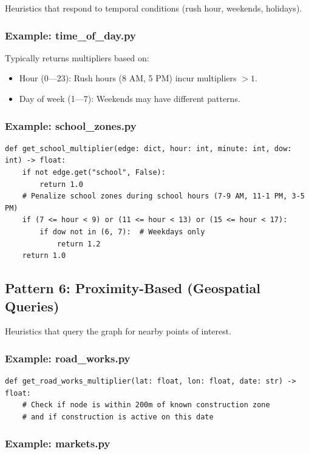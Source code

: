 \documentclass[12pt,a4paper]{article}
\begin{document}
Heuristics that respond to temporal conditions (rush hour, weekends, holidays).

\subsubsection{Example: time\_of\_day.py}

Typically returns multipliers based on:
\begin{itemize}
  \item Hour (0---23): Rush hours (8 AM, 5 PM) incur multipliers $> 1$.
  \item Day of week (1---7): Weekends may have different patterns.
\end{itemize}

\subsubsection{Example: school\_zones.py}

\begin{lstlisting}
def get_school_multiplier(edge: dict, hour: int, minute: int, dow: int) -> float:
    if not edge.get("school", False):
        return 1.0
    # Penalize school zones during school hours (7-9 AM, 11-1 PM, 3-5 PM)
    if (7 <= hour < 9) or (11 <= hour < 13) or (15 <= hour < 17):
        if dow not in (6, 7):  # Weekdays only
            return 1.2
    return 1.0
\end{lstlisting}

\subsection{Pattern 6: Proximity-Based (Geospatial Queries)}

Heuristics that query the graph for nearby points of interest.

\subsubsection{Example: road\_works.py}

\begin{lstlisting}
def get_road_works_multiplier(lat: float, lon: float, date: str) -> float:
    # Check if node is within 200m of known construction zone
    # and if construction is active on this date
\end{lstlisting}

\subsubsection{Example: markets.py}
\end{document}
